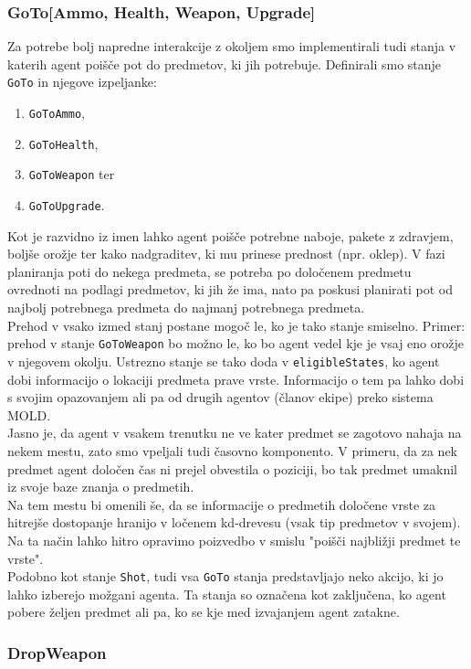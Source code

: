 \documentclass[a4paper,10pt]{article}
\begin{document}
\subsubsection{GoTo[Ammo, Health, Weapon, Upgrade]}
Za potrebe bolj napredne interakcije z okoljem smo implementirali tudi stanja v katerih agent poišče pot do predmetov, ki jih potrebuje.
Definirali smo stanje \verb+GoTo+ in njegove izpeljanke:
\begin{enumerate}
 \item \verb+GoToAmmo+,
 \item \verb+GoToHealth+,
 \item \verb+GoToWeapon+ ter
 \item \verb+GoToUpgrade+.
\end{enumerate}
Kot je razvidno iz imen lahko agent poišče potrebne naboje, pakete z zdravjem, boljše orožje ter kako nadgraditev, ki mu prinese prednost (npr. 
oklep). V fazi planiranja poti do nekega predmeta, se potreba po določenem predmetu ovrednoti na podlagi predmetov, ki jih že ima, nato pa poskusi
planirati pot od najbolj potrebnega predmeta do najmanj potrebnega predmeta.\\
Prehod v vsako izmed stanj postane mogoč le, ko je tako stanje smiselno. Primer: prehod v stanje \verb+GoToWeapon+ bo možno le, ko bo agent
vedel kje je vsaj eno orožje v njegovem okolju. Ustrezno stanje se tako doda v \verb+eligibleStates+, ko agent dobi informacijo o lokaciji predmeta
prave vrste. Informacijo o tem pa lahko dobi s svojim opazovanjem ali pa od drugih agentov (članov ekipe) preko sistema MOLD.\\ 
Jasno je, da agent v vsakem trenutku ne ve kater predmet se zagotovo nahaja na nekem mestu, zato smo vpeljali tudi časovno komponento. V primeru, da 
za nek predmet agent določen čas ni prejel obvestila o poziciji, bo tak predmet umaknil iz svoje baze znanja o predmetih.\\
Na tem mestu bi omenili še, da se informacije o predmetih določene vrste za hitrejše dostopanje hranijo v ločenem kd-drevesu (vsak tip predmetov v svojem). 
Na ta način lahko hitro opravimo poizvedbo v smislu "poišči najbližji predmet te vrste".\\
Podobno kot stanje \verb+Shot+, tudi vsa \verb+GoTo+ stanja predstavljajo neko akcijo, ki jo lahko izberejo možgani agenta. Ta stanja so označena kot zaključena,
ko agent pobere željen predmet ali pa, ko se kje med izvajanjem agent zatakne. 
\subsubsection{DropWeapon} \label{sec:states-dropweapon}
\end{document}
